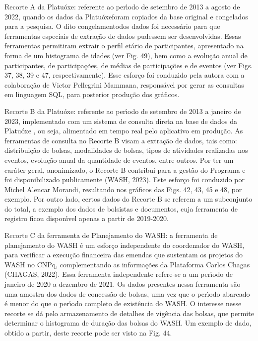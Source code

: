 \documentclass[
12pt,		%
openright,	%
twoside,  %
a4paper,			%
chapter=TITLE,		%
english,			%
french,				%
spanish,			%
brazil				%
]{USPSC-classe/USPSC}
\begin{document}
\begin{alineas}
\item Recorte A da Platu\'oxe: referente ao per\'{\i}odo de setembro de 2013 a agosto de 2022, quando os dados da \textquotedbl Platu\'oxe\textquotedbl  foram copiados da base original e \textquotedbl congelados \textquotedbl  para a pesquisa. O dito  \textquotedbl congelamento\textquotedbl  dos dados foi necess\'ario para que ferramentas especiais de extra\c{c}\~ao de dados pudessem ser desenvolvidas. Essas ferramentas permitiram extrair o perfil et\'ario de participantes, apresentado na forma de um histograma de idades (ver Fig. 49), bem como a evolu\c{c}\~ao anual de participantes, de participa\c{c}\~oes, de m\'edias de participa\c{c}\~oes e de eventos (ver Figs. 37, 38, 39 e 47, respectivamente). Esse esfor\c{c}o foi conduzido pela autora com a colabora\c{c}\~ao de Victor Pellegrini Mammana, respons\'avel por gerar as consultas em linguagem SQL, para posterior produ\c{c}\~ao dos gr\'aficos.
\item Recorte B da Platu\'oxe: referente ao per\'{\i}odo de setembro de 2013 a janeiro de 2023, implementado com um sistema de consulta direta na base de dados da \textquotedbl Platu\'oxe \textquotedbl , ou seja, alimentado em tempo real pelo aplicativo em produ\c{c}\~ao. As ferramentas de consulta no Recorte B visam a extra\c{c}\~ao de dados, tais como: distribui\c{c}\~ao de bolsas, modalidades de bolsas, tipos de atividades realizadas nos eventos, evolu\c{c}\~ao anual da quantidade de eventos,  entre outros. Por ter um car\'ater geral, anonimizado, o Recorte B contribui para a gest\~ao do Programa e foi disponibilizado publicamente  (WASH, 2023). Este esfor\c{c}o foi conduzido por Michel Alencar Morandi, resultando nos gr\'aficos das  Figs. 42, 43, 45 e 48, por exemplo. Por outro lado, certos dados do Recorte B se referem a um subconjunto do total, a exemplo dos dados de bolsistas e documentos, cuja ferramenta de registro ficou dispon\'{\i}vel apenas a partir de 2019-2020.
\item Recorte C da ferramenta de Planejamento do WASH: a ferramenta de planejamento do WASH \'e um esfor\c{c}o independente do coordenador do WASH, para verificar a execu\c{c}\~ao financeira das emendas que sustentam os projetos do WASH no CNPq, complementando as informa\c{c}\~oes da Plataforma Carlos Chagas  (CHAGAS, 2022). Essa ferramenta independente refere-se a um per\'{\i}odo de janeiro de 2020 a dezembro de 2021. Os dados presentes nessa ferramenta s\~ao uma amostra dos dados de concess\~ao de bolsas, uma vez que o per\'{\i}odo abarcado \'e menor do que o per\'{\i}odo completo de exist\^encia do WASH. O interesse nesse recorte se d\'a pelo armazenamento de detalhes de vig\^encia das bolsas, que permite determinar o histograma de dura\c{c}\~ao das bolsas do WASH. Um exemplo de dado, obtido a partir, deste recorte pode ser visto na Fig. 44.
\end{alineas}
\end{document}
